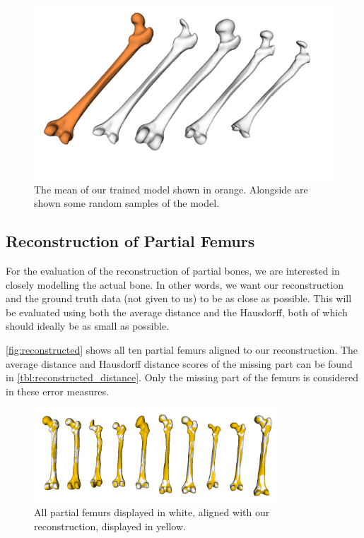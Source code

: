\begin{figure}
	\centering
  \includegraphics[width=\columnwidth]{./Figures/interpolated_model_samples}
  \caption{
    The mean of our trained model shown in orange.
    Alongside are shown some random samples of the model.}
  \label{fig:trained_model}
\end{figure}


\subsection{Reconstruction of Partial Femurs}
\label{subsec:reconresults}
For the evaluation of the reconstruction of partial bones, we are interested in closely modelling the actual bone.
In other words, we want our reconstruction and the ground truth data (not given to us) to be as close as possible. 
This will be evaluated using both the average distance and the Hausdorff, both of which should ideally be as small as possible.

\autoref{fig:reconstructed} shows all ten partial femurs aligned to our reconstruction.
The average distance and Hausdorff distance scores of the missing part can be found in \autoref{tbl:reconstructed_distance}.
Only the missing part of the femurs is considered in these error measures.

\begin{figure}
	\centering
  \includegraphics[width=0.82\textwidth]{./Figures/reconstruction_summary}
  \caption{All partial femurs displayed in white, aligned with our reconstruction, displayed in yellow.}
  \label{fig:reconstructed}
\end{figure}

